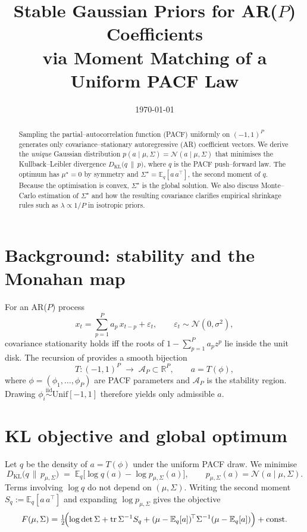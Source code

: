 \documentclass[11pt]{article}
\title{Stable Gaussian Priors for AR($P$) Coefficients\\[2pt]
       via Moment Matching of a Uniform PACF Law}
\date{\today}
\begin{document}
\maketitle

\begin{abstract}
Sampling the partial--autocorrelation function (PACF) uniformly on
$(-1,1)^P$ generates only covariance--stationary autoregressive (AR)
coefficient vectors.  We derive the \emph{unique} Gaussian distribution
$p(a\mid\mu,\Sigma)=\mathcal N(a\mid\mu,\Sigma)$ that minimises the
Kullback--Leibler divergence $D_{\mathrm{KL}}\bigl(q\,\|\,p\bigr)$,
where $q$ is the PACF push--forward law.  The optimum has
$\mu^\star=0$ by symmetry and
$\Sigma^\star=\mathbb E_q[a\,a^{\top}]$, the second moment of $q$.
Because the optimisation is convex, $\Sigma^\star$ is the global
solution.  We also discuss Monte--Carlo estimation of $\Sigma^\star$
and how the resulting covariance clarifies empirical shrinkage rules
such as $\lambda\propto 1/P$ in isotropic priors.
\end{abstract}


\section{Background: stability and the Monahan map}

For an AR($P$) process
\[
  x_t=\sum_{p=1}^{P} a_p\,x_{t-p}+\varepsilon_t,
  \qquad \varepsilon_t\sim\mathcal N(0,\sigma^2),
\]
covariance stationarity holds iff the roots of
$1-\sum_{p=1}^{P}a_p z^p$ lie inside the unit disk.  The recursion of
\cite{Monahan1984} provides a smooth bijection
\[
  T:(-1,1)^P\;\longrightarrow\;\mathcal A_P\subset\mathbb R^P,
  \qquad a = T(\phi),
\]
where $\phi=(\phi_1,\dots,\phi_P)$ are PACF parameters and
$\mathcal A_P$ is the stability region.  Drawing
$\phi_i \stackrel{\text{iid}}{\sim}\mathrm{Unif}[-1,1]$ therefore yields
only admissible $a$.


\section{KL objective and global optimum}

Let $q$ be the density of $a=T(\phi)$ under the uniform PACF draw.
We minimise
\[
  D_{\mathrm{KL}}\!\bigl(q\,\|\,p_{\mu,\Sigma}\bigr)
  \;=\;
  \mathbb E_q\bigl[\log q(a)-\log p_{\mu,\Sigma}(a)\bigr],
  \qquad
  p_{\mu,\Sigma}(a)=\mathcal N(a\mid\mu,\Sigma).
\]
Terms involving $\log q$ do not depend on $(\mu,\Sigma)$.
Writing the second moment
$S_q:=\mathbb E_q[a\,a^{\top}]$ and expanding
$\log p_{\mu,\Sigma}$ gives the objective
\[
  F(\mu,\Sigma)=
    \tfrac12\!\Bigl(
      \log\det\Sigma
      +\operatorname{tr}\Sigma^{-1}S_q
      +(\mu-\mathbb E_q[a])^{\!\top}\Sigma^{-1}(\mu-\mathbb E_q[a])
    \Bigr)
    +\text{const.}
\]
\end{document}

